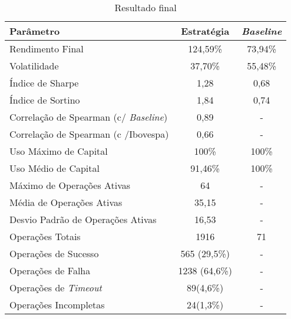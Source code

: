 \begin{table}[h!]
    \begin{center}
        \begin{tabular}{ l|c|c }
            Parâmetro & Estratégia & \textit{Baseline} \\
            \hline
            Rendimento Final & 124,59\% & 73,94\% \\
            Volatilidade & 37,70\% & 55,48\% \\
            Índice de Sharpe & 1,28 & 0,68 \\
            Índice de Sortino & 1,84 & 0,74 \\
            Correlação de Spearman (c/ \textit{Baseline}) & 0,89 & - \\
            Correlação de Spearman (c /Ibovespa) & 0,66 & - \\
            Uso Máximo de Capital & 100\% & 100\% \\
            Uso Médio de Capital & 91,46\% & 100\% \\
            Máximo de Operações Ativas & 64 & - \\
            Média de Operações Ativas & 35,15 & - \\
            Desvio Padrão de Operações Ativas & 16,53 & -\\
            Operações Totais & 1916 & 71 \\
            Operações de Sucesso & 565 (29,5\%) & - \\
            Operações de Falha & 1238 (64,6\%) & - \\
            Operações de \textit{Timeout} & 89(4,6\%) & - \\
            Operações Incompletas & 24(1,3\%) & - \\
        \end{tabular}
        \caption{Resultado final}
        \label{tab:13}
    \end{center}
\end{table}

